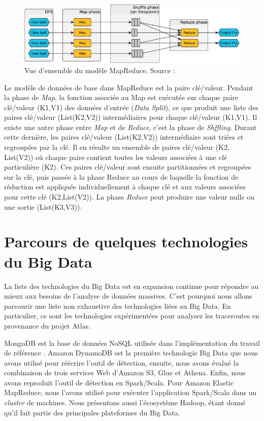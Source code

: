 \begin{figure}[h]
	\centering
	\includegraphics[width=\linewidth]{illustrations/2-Figure1-1-map-reduce-workflow}
	\caption{Vue d'ensemble du modèle MapReduce. Source : \cite{6427487}}
	\label{fig:2-figure1-1-map-reduce-workflow}
\end{figure}


Le modèle de données de base dans MapReduce  est la paire clé/valeur. Pendant la phase de \textit{Map}, la fonction  associée  au Map est exécutée sur chaque paire clé/valeur (K1,V1) des données d'entrée (\textit{Data Split}), ce que produit   une liste des paires clé/valeur (List(K2,V2)) intermédiaires pour chaque clé/valeur (K1,V1). Il existe une autre phase entre  \textit{Map} et de \textit{Reduce}, c'est la phase de \textit{Shffling}. Durant cette dernière,  les paires clé/valeur (List(K2,V2))  intermédiaire sont triées et regroupées par la clé. Il en résulte un ensemble de paires clé/valeur (K2, List(V2)) où chaque paire contient toutes les valeurs associées à une clé particulière (K2). Ces paires clé/valeur sont ensuite partitionnées et regroupées sur la clé, puis passée à la phase Reduce au cours de laquelle la fonction de réduction est appliquée individuellement à chaque clé et aux valeurs associées pour cette clé (K2,List(V2)). La phase \textit{Reduce} peut produire une valeur nulle ou une sortie (List(K3,V3)).

\section{Parcours de quelques technologies du Big Data}
La liste des technologies  du Big Data est en expansion continue pour répondre au mieux aux besoins de l'analyse de données massives. C'est pourquoi nous allons parcourir une liste non exhaustive des technologies liées au Big Data. En particulier, ce sont les technologies expérimentées pour analyser les traceroutes en provenance du projet Atlas.

MongoDB est la base de données NoSQL utilisée dans l'implémentation du travail de référence \cite{InternetHealthReport}. Amazon DynamoDB est la première technologie Big Data que nous avons utilisé pour réécrire l'outil de détection, ensuite, nous avons évalué la combinaison de trois services Web d'Amazon S3, Glue et Athena. Enfin, nous avons reproduit l'outil de détection en Spark/Scala. Pour Amazon Elastic MapReduce, nous l'avons utilisé pour exécuter l'application Spark/Scala dans un \textit{cluster} de machines. Nous présentons aussi l'écosystème Hadoop, étant donné qu'il fait partie des principales plateformes du Big Data.
	
